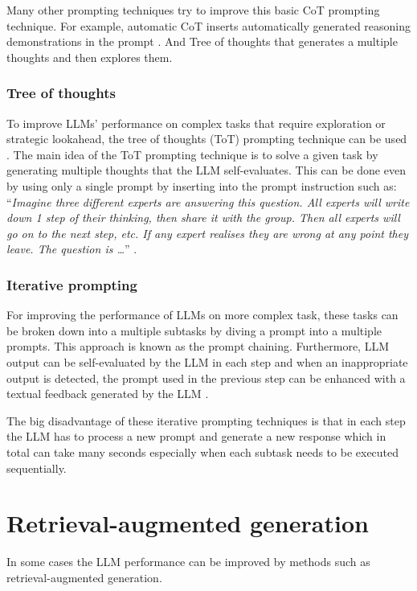 Many other prompting techniques try to improve this basic CoT prompting technique. For example, automatic CoT inserts automatically generated reasoning demonstrations in the prompt \cite{Zhang2022}. And Tree of thoughts that generates a multiple thoughts and then explores them.


\subsubsection{Tree of thoughts}

To improve LLMs' performance on complex tasks that require exploration or strategic lookahead, the tree of thoughts (ToT) prompting technique can be used \cite{Long2023, Yao2024}. The main idea of the ToT prompting technique is to solve a given task by generating multiple thoughts that the LLM self-evaluates. This can be done even by using only a single prompt by inserting into the prompt instruction such as: ``\textit{Imagine three different experts are answering this question. All experts will write down 1 step of their thinking, then share it with the group. Then all experts will go on to the next step, etc. If any expert realises they are wrong at any point they leave. The question is \ldots}'' \cite{Hulbert2023}.


\subsubsection{Iterative prompting}

For improving the performance of LLMs on more complex task, these tasks can be broken down into a multiple subtasks by diving a prompt into a multiple prompts. This approach is known as the prompt chaining. Furthermore, LLM output can be self-evaluated by the LLM in each step and when an inappropriate output is detected, the prompt used in the previous step can be enhanced with a textual feedback generated by the LLM \cite{Shinn2024}.

The big disadvantage of these iterative prompting techniques is that in each step the LLM has to process a new prompt and generate a new response which in total can take many seconds especially when each subtask needs to be executed sequentially.


\section{Retrieval-augmented generation}

In some cases the LLM performance can be improved by methods such as retrieval-augmented generation.

